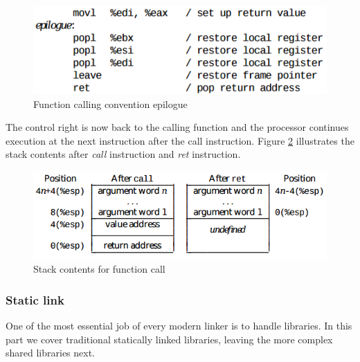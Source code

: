                \begin{figure}[H]
                    \centering                    \includegraphics[scale = 0.5]
                    {Images/concepts/FCCepilogue.png}
                    \caption[Function calling convention epilogue]%
                    {Function calling convention epilogue\cite{SCO-386}}    
                    \label{fig:FCCepilogue}
              \end{figure}
              
       The control right is now back to the calling function and the processor continues execution at the next instruction after the call instruction. Figure \ref{fig:FCCret} illustrates the stack contents after \textit{call} instruction and \textit{ret} instruction.
       
               \begin{figure}[H]
                    \centering
                    \includegraphics[scale = 0.45]
                    {Images/concepts/FCCret.png}
                    \caption[Stack contents for function call]%
                    {Stack contents for function call\cite{SCO-386}}    
                    \label{fig:FCCret}
              \end{figure}
              
       \subsubsection{Static link}
       One of the most essential job of every modern linker is to handle libraries\cite{LAL-00}. In this part we cover traditional statically linked libraries, leaving the more complex shared libraries next. 
       
